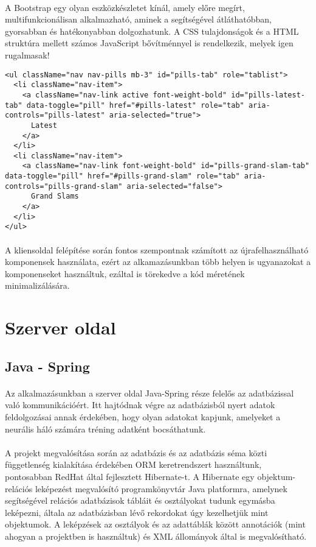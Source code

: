 \paragraph{}
A Bootstrap egy olyan eszközkészletet kínál, amely előre megírt, multifunkcionálisan alkalmazható, aminek a segítségével átláthatóbban, gyorsabban és hatékonyabban dolgozhatunk. A CSS tulajdonságok és a HTML struktúra mellett számos JavaScript bővítménnyel is rendelkezik, melyek igen rugalmasak!

\begin{lstlisting}[caption=Responsive webtervezés - Bootstrap keretrendszer]
<ul className="nav nav-pills mb-3" id="pills-tab" role="tablist">
  <li className="nav-item">
    <a className="nav-link active font-weight-bold" id="pills-latest-tab" data-toggle="pill" href="#pills-latest" role="tab" aria-controls="pills-latest" aria-selected="true"> 
      Latest 
    </a>
  </li>
  <li className="nav-item">
    <a className="nav-link font-weight-bold" id="pills-grand-slam-tab" data-toggle="pill" href="#pills-grand-slam" role="tab" aria-controls="pills-grand-slam" aria-selected="false"> 
      Grand Slams 
    </a>
  </li>
</ul>
\end{lstlisting}

\paragraph{} A kliensoldal felépítése során fontos szempontnak számított az újrafelhasználható komponensek használata, ezért az alkamazásunkban több helyen is ugyanazokat a komponenseket használtuk, ezáltal is törekedve a kód méretének minimalizálására.

\section{Szerver oldal}
\subsection{Java - Spring}
\paragraph{}
Az alkalmazásunkban a szerver oldal Java-Spring része felelős az adatbázissal való kommunikációért. Itt hajtódnak végre az adatbázisból nyert adatok feldolgozásai annak érdekében, hogy olyan adatokat kapjunk, amelyeket a neurális háló számára tréning adatként bocsáthatunk.

\paragraph{}
A projekt megvalósítása során az adatbázis és az adatbázis séma közti függetlenség kialakítása érdekében ORM keretrendszert használtunk, pontosabban RedHat által fejlesztett Hibernate-t. A Hibernate egy objektum-relációs leképezést megvalósító programkönyvtár Java platformra, amelynek segítségével relációs adatbázisok tábláit és osztályokat tudunk egymásba leképezni, általa az adatbázisban lévő rekordokat úgy kezelhetjük mint objektumok. A leképzések az osztályok és az adattáblák között annotációk (mint ahogyan a projektben is használtuk) és XML állományok által is megvalósítható. 

